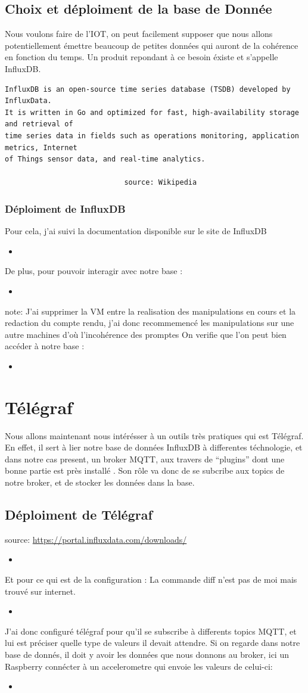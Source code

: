 \documentclass[10pt,a4paper]{article}
\newcommand{\insertcode}[2]{\begin{itemize}\item[]\end{itemize}}
\begin{document}
 \subsection{Choix et déploiment de la base de Donnée}
 Nous voulons faire de l'IOT, on peut facilement supposer que nous allons potentiellement émettre beaucoup de petites données qui auront de la cohérence en fonction du temps. Un produit repondant à ce besoin éxiste et s'appelle InfluxDB. 
\begin{lstlisting}
InfluxDB is an open-source time series database (TSDB) developed by InfluxData.
It is written in Go and optimized for fast, high-availability storage and retrieval of
time series data in fields such as operations monitoring, application metrics, Internet
of Things sensor data, and real-time analytics. 

                            source: Wikipedia 
\end{lstlisting}
\subsubsection{Déploiment de InfluxDB}
Pour cela, j'ai suivi la documentation disponible sur le site de InfluxDB
\insertcode{commande/installinflux.txt}{Installation de InfluxDB}
De plus, pour pouvoir interagir avec notre base :
\insertcode{commande/installclient.txt}{Installation du client}
note: J'ai supprimer la VM entre la realisation des manipulations en cours et la redaction du compte rendu, j'ai donc recommemencé les manipulations sur une autre machines d'où l'incohérence des promptes
On verifie que l'on peut bien accéder à notre base :
\insertcode{commande/influx.txt}{accées à la base}

\section{Télégraf}
Nous allons maintenant nous intérésser à un outils très pratiques qui est Télégraf. En effet, il sert à lier notre base de données InfluxDB à differentes téchnologie, et dans notre cas present, un broker MQTT, aux travers de ``plugins'' dont une bonne partie est près installé . Son rôle va donc de se subcribe aux topics de notre broker, et de stocker les données dans la base. 
\subsection{Déploiment de Télégraf}
source: \url{https://portal.influxdata.com/downloads/}
\insertcode{commande/telegraf.txt}{Déploiment de télégraf}
Et pour ce qui est de la configuration : La commande diff n'est pas de moi mais trouvé sur internet. 
\insertcode{commande/telegrafconf.txt}{Configuration de télégraf}
J'ai donc configuré télégraf pour qu'il se subscribe à differents topics MQTT, et lui est préciser quelle type de valeurs il devait attendre.
Si on regarde dans notre base de donnés, il doit y avoir les données que nous donnons au broker, ici un Raspberry connécter à un accelerometre qui envoie les valeurs de celui-ci:
\insertcode{commande/pow.txt}{Preuve que Télégraf fonctionne}
\end{document}
